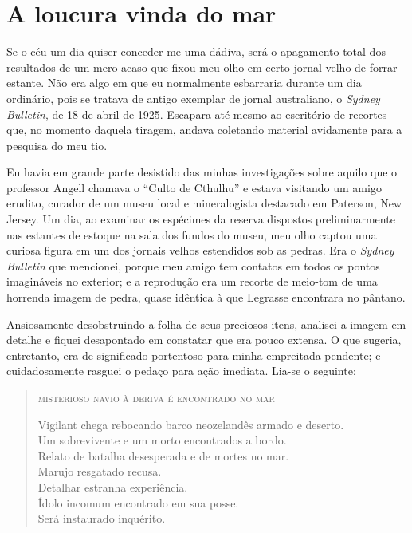 \chapter{A loucura vinda do mar}

\noindent{}Se o céu um dia quiser conceder-me uma dádiva, será o apagamento total
dos resultados de um mero acaso que fixou meu olho em certo jornal velho
de forrar estante. Não era algo em que eu normalmente esbarraria durante
um dia ordinário, pois se tratava de antigo exemplar de jornal
australiano, o \emph{Sydney Bulletin}, de 18 de abril de 1925. Escapara
até mesmo ao escritório de recortes que, no momento daquela tiragem,
andava coletando material avidamente para a pesquisa do meu tio.

Eu havia em grande parte desistido das minhas investigações sobre aquilo
que o professor Angell chamava o ``Culto de Cthulhu'' e estava
visitando um amigo erudito, curador de um museu local e
mineralogista destacado em Paterson, New Jersey. Um dia, ao examinar os
espécimes da reserva dispostos preliminarmente nas estantes de estoque
na sala dos fundos do museu, meu olho captou uma curiosa figura em um
dos jornais velhos estendidos sob as pedras. Era o \emph{Sydney
Bulletin} que mencionei, porque meu amigo tem contatos em todos os
pontos imagináveis no exterior; e a reprodução era um recorte de
meio-tom de uma horrenda imagem de pedra, quase idêntica à que Legrasse
encontrara no pântano.

Ansiosamente desobstruindo a folha de seus preciosos itens, analisei 
a imagem em detalhe e fiquei desapontado em constatar que era pouco extensa. 
O que sugeria, entretanto, era de significado portentoso para minha
empreitada pendente; e cuidadosamente rasguei o pedaço para ação
imediata. Lia-se o seguinte:

\pagebreak
\begin{quote}
\textsc{misterioso navio à deriva é encontrado no mar}

\smallskip

\noindent Vigilant chega rebocando barco neozelandês armado e deserto.\\
Um sobrevivente e um morto encontrados a bordo.\\
Relato de batalha desesperada e de mortes no mar.\\
Marujo resgatado recusa.\\
Detalhar estranha experiência.\\
Ídolo incomum encontrado em sua posse.\\
Será instaurado inquérito.
\end{quote}

